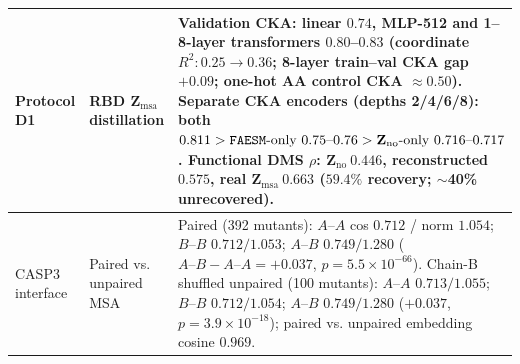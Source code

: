 \documentclass[10pt,a4paper]{article}
\begin{document}
\begin{table}[!ht]
\begin{tabularx}{\textwidth}{l l Y}
\midrule
Protocol D1 & RBD $\mathbf{Z}_{\mathrm{msa}}$ distillation & Validation CKA: linear $0.74$, MLP-512 and 1--8-layer transformers $0.80$--$0.83$ (coordinate $R^2: 0.25 \rightarrow 0.36$; 8-layer train--val CKA gap $+0.09$; one-hot AA control CKA $\approx 0.50$). Separate CKA encoders (depths 2/4/6/8): both $0.811 > \text{\texttt{FAESM}-only } 0.75\text{--}0.76 > \mathbf{Z}_{\mathrm{no}}\text{-only } 0.716\text{--}0.717$. Functional DMS $\rho$: $\mathbf{Z}_{\mathrm{no}}~0.446$, reconstructed $0.575$, real $\mathbf{Z}_{\mathrm{msa}}~0.663$ ($59.4\%$ recovery; $\sim$40\% unrecovered). \\
\midrule
CASP3 interface & Paired vs. unpaired MSA & Paired (392 mutants): $A\text{--}A$ cos $0.712$ / norm $1.054$; $B\text{--}B$ $0.712 / 1.053$; $A\text{--}B$ $0.749 / 1.280$ ($A\text{--}B - A\text{--}A = +0.037$, $p=5.5\times 10^{-66}$). Chain-B shuffled unpaired (100 mutants): $A\text{--}A$ $0.713 / 1.055$; $B\text{--}B$ $0.712 / 1.054$; $A\text{--}B$ $0.749 / 1.280$ ($+0.037$, $p=3.9\times 10^{-18}$); paired vs. unpaired embedding cosine $0.969$. \\
\bottomrule
\end{tabularx}
\end{table}
\end{document}
